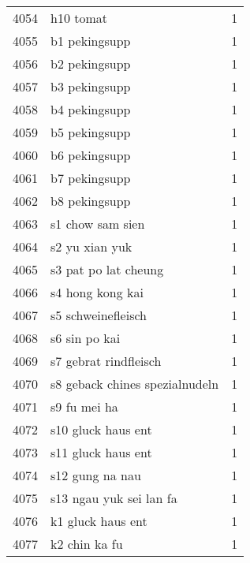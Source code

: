 \begin{tabular}{llr}
4054 &                                          h10 tomat &      1 \\
4055 &                                      b1 pekingsupp &      1 \\
4056 &                                      b2 pekingsupp &      1 \\
4057 &                                      b3 pekingsupp &      1 \\
4058 &                                      b4 pekingsupp &      1 \\
4059 &                                      b5 pekingsupp &      1 \\
4060 &                                      b6 pekingsupp &      1 \\
4061 &                                      b7 pekingsupp &      1 \\
4062 &                                      b8 pekingsupp &      1 \\
4063 &                                   s1 chow sam sien &      1 \\
4064 &                                     s2 yu xian yuk &      1 \\
4065 &                               s3 pat po lat cheung &      1 \\
4066 &                                   s4 hong kong kai &      1 \\
4067 &                                 s5 schweinefleisch &      1 \\
4068 &                                      s6 sin po kai &      1 \\
4069 &                              s7 gebrat rindfleisch &      1 \\
4070 &                     s8 geback chines spezialnudeln &      1 \\
4071 &                                       s9 fu mei ha &      1 \\
4072 &                                 s10 gluck haus ent &      1 \\
4073 &                                 s11 gluck haus ent &      1 \\
4074 &                                    s12 gung na nau &      1 \\
4075 &                            s13 ngau yuk sei lan fa &      1 \\
4076 &                                  k1 gluck haus ent &      1 \\
4077 &                                      k2 chin ka fu &      1 \\

\end{tabular}
